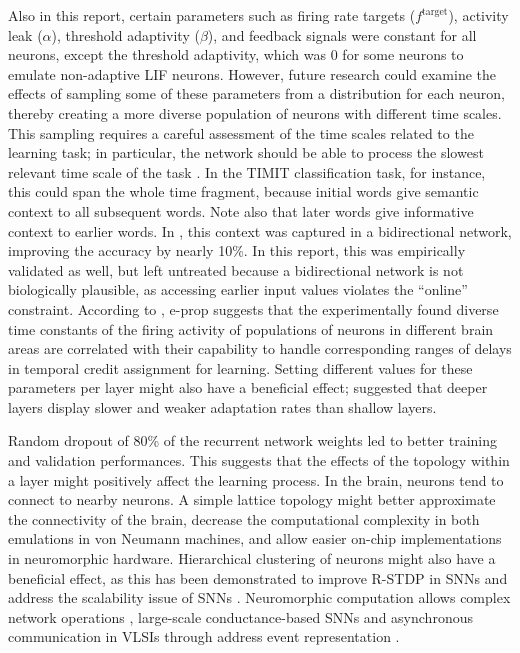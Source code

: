     Also in this report, certain parameters such as firing rate targets ($f^\text{target}$), activity leak ($\alpha$), threshold adaptivity ($\beta$), and feedback signals were constant for all neurons, except the threshold adaptivity, which was 0 for some neurons to emulate non-adaptive LIF neurons.
    However, future research could examine the effects of sampling some of these parameters from a distribution for each neuron, thereby creating a more diverse population of neurons with different time scales.
    This sampling requires a careful assessment of the time scales related to the learning task; in particular, the network should be able to process the slowest relevant time scale of the task \citep{jaeger2021dimensions}.
    In the TIMIT classification task, for instance, this could span the whole time fragment, because initial words give semantic context to all subsequent words.
    Note also that later words give informative context to earlier words.
    In \citet{bellec2020solution}, this context was captured in a bidirectional network, improving the accuracy by nearly 10\%.
    In this report, this was empirically validated as well, but left untreated because a bidirectional network is not biologically plausible, as accessing earlier input values violates the ``online'' constraint.
    According to \citet{bellec2020solution}, e-prop suggests that the experimentally found diverse time constants of the firing activity of populations of neurons in different brain areas \citep{runyan2017distinct} are correlated with their capability to handle corresponding ranges of delays in temporal credit assignment for learning.
    Setting different values for these parameters per layer might also have a beneficial effect; \citet{ahmed1998estimates} suggested that deeper layers display slower and weaker adaptation rates than shallow layers.

    Random dropout of 80\% of the recurrent network weights led to better training and validation performances.
    This suggests that the effects of the topology within a layer might positively affect the learning process.
    In the brain, neurons tend to connect to nearby neurons.
    A simple lattice topology might better approximate the connectivity of the brain, decrease the computational complexity in both emulations in von Neumann machines, and allow easier on-chip implementations in neuromorphic hardware.
    Hierarchical clustering of neurons might also have a beneficial effect, as this has been demonstrated to improve R-STDP in SNNs \citep{weidel2020unsupervised} and address the scalability issue of SNNs \citep{carrillo2012scalable}.
    Neuromorphic computation allows complex network operations \citep{hasler1990vlsi}, large-scale conductance-based SNNs \citep{yang2019scalable,Yang2019RealTimeNS} and asynchronous communication in VLSIs through address event representation \citep{lazzaro1993silicon,deiss1999pulse}.

